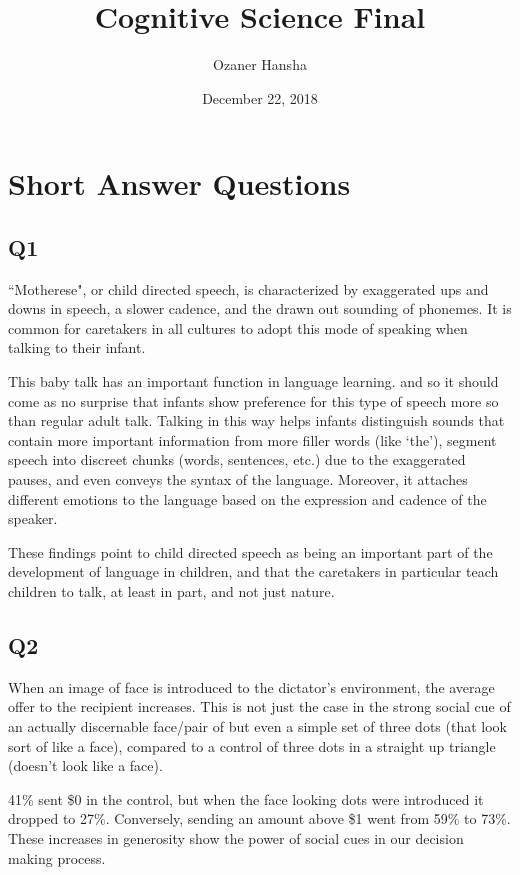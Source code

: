 \documentclass{article}
\begin{document}
\title{Cognitive Science Final}
\author{Ozaner Hansha}
\date{December 22, 2018}
\maketitle

\doublespace

\section*{Short Answer Questions}
\subsection*{Q1}
``Motherese", or child directed speech, is characterized by exaggerated ups and downs in speech, a slower cadence, and the drawn out sounding of phonemes. It is common for caretakers in all cultures to adopt this mode of speaking when talking to their infant.

This baby talk has an important function in language learning. and so it should come as no surprise that infants show preference for this type of speech more so than regular adult talk. Talking in this way helps infants distinguish sounds that contain more important information from more filler words (like `the'), segment speech into discreet chunks (words, sentences, etc.) due to the exaggerated pauses, and even conveys the syntax of the language. Moreover, it attaches different emotions to the language based on the expression and cadence of the speaker.

These findings point to child directed speech as being an important part of the development of language in children, and that the caretakers in particular teach children to talk, at least in part, and not just nature.

\subsection*{Q2}
When an image of face is introduced to the dictator's environment, the average offer to the recipient increases. This is not just the case in the strong social cue of an actually discernable face/pair of but even a simple set of three dots (that look sort of like a face), compared to a control of three dots in a straight up triangle (doesn't look like a face).

41\% sent \$0 in the control, but when the face looking dots were introduced it dropped to 27\%. Conversely, sending an amount above \$1 went from 59\% to 73\%. These increases in generosity show the power of social cues in our decision making process.
\end{document}
